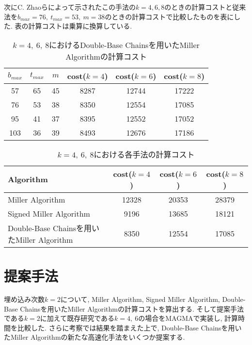 \clearpage
次にC. Zhaoらによって示されたこの手法の$k=4,6,8$のときの計算コストと従来法を$b_{max} = 76,\ t_{max} = 53,\ m = 38$のときの計算コストで比較したものを表にした. 表の計算コストは乗算に換算している. 
\begin{table}[htbp]
 \begin{center}
  \begin{tabular}{|c|c|c|c|c|c|}
  \hline
  $b_{max}$ & $t_{max}$ & $m$ & cost($k=4$) & cost($k=6$) & cost($k=8$) \\
  \hline
  57 & 65 & 45 & 8287 & 12744 & 17222 \\
  \hline
  76 & 53 & 38 & 8350 & 12554 & 17085 \\
  \hline
  95 & 41 & 37 & 8395 & 12552 & 17052 \\
  \hline
  103 & 36 & 39 & 8493 & 12676 & 17186 \\
  \hline
  \end{tabular}
 \end{center}
 \caption{$k=4,\ 6,\ 8$におけるDouble-Base Chainsを用いたMiller Algorithmの計算コスト}
\end{table}
\begin{table}[htbp]
 \begin{center}
  \begin{tabular}{|l|c|c|c|}
  \hline
  Algorithm & cost($k=4$) & cost($k=6$) & cost($k=8$) \\
  \hline
  Miller Algorithm & 12328 & 20353 & 28379 \\
  \hline
  Signed Miller Algorithm & 9196 & 13685 & 18121 \\
  \hline
  Double-Base Chainsを用いたMiller Algorithm & 8350 & 12554 & 17085 \\
  \hline
  \end{tabular}
 \end{center}
 \caption{$k=4,\ 6,\ 8$における各手法の計算コスト}
\end{table}
\section{提案手法}
埋め込み次数$k=2$について, Miller Algorithm, Signed Miller Algorithm, Double-Base Chainsを用いたMiller Algorithmの計算コストを算出する. そして提案手法である$k=2$に加えて既存研究である$k=4,\ 6$の場合をMAGMAで実装し, 計算時間を比較した. さらに考察では結果を踏まえた上で, Double-Base Chainsを用いたMiller Algorithmの新たな高速化手法をいくつか提案する. 